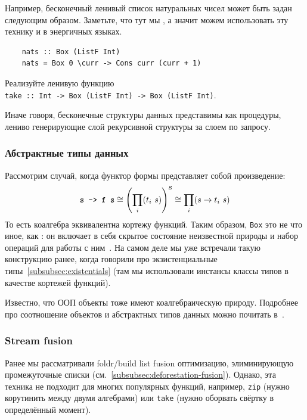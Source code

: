 Например, бесконечный ленивый список натуральных чисел может быть задан следующим образом.
Заметьте, что тут мы , а значит можем использовать эту технику и в энергичных языках.
\begin{verbatim}
    nats :: Box (ListF Int)
    nats = Box 0 \curr -> Cons curr (curr + 1)
\end{verbatim}

\begin{task}
    Реализуйте ленивую функцию \\ \texttt{take :: Int -> Box (ListF Int) -> Box (ListF Int)}.
\end{task}

Иначе говоря, бесконечные структуры данных представимы как процедуры, лениво генерирующие слой рекурсивной структуры за слоем по запросу.

\subsubsection{Абстрактные типы данных} \label{subsubsec:abstract-data-types}

Рассмотрим случай, когда функтор формы представляет собой произведение:
\[
    \text{\texttt{s -> f s}} \cong \left( \prod_{i}(t_i~ s) \right)^{\displaystyle s} \cong \prod_i(s\to t_i~ s)
\]
То есть коалгебра эквивалентна кортежу функций.
Таким образом, \texttt{Box} это не что иное, как : он включает в себя скрытое состояние неизвестной природы и набор операций для работы с ним~\cite{gibbons2008unfolding}.
На самом деле мы уже встречали такую конструкцию ранее, когда говорили про экзистенциальные типы~\ref{subsubsec:existentials} (там мы использовали инстансы классы типов в качестве кортежей функций).

Известно, что ООП объекты тоже имеют коалгебраическую природу.
Подробнее про соотношение объектов и абстрактных типов данных можно почитать в~\cite{cook2009understanding}.


\subsubsection{Stream fusion} \label{subsubsec:stream-fusion}

Ранее мы рассматривали foldr/build list fusion оптимизацию, элиминирующую промежуточные списки (см.~\ref{subsubsec:deforestation-fusion}).
Однако, эта техника не подходит для многих популярных функций, например, \texttt{zip} (нужно корутинить между двумя алгебрами) или \texttt{take} (нужно оборвать свёртку в определённый момент).

